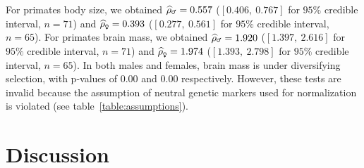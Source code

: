 \documentclass{article}
\newcommand{\NbrTaxa}{n}
\newcommand{\EstNI}{\widehat{\rho}}
\begin{document}
For primates body size, we obtained $\EstNI_{\text{\Male}} = 0.557$ ($[0.406,~0.767]$ for $95\%$ credible interval, $\NbrTaxa=71$) and $\EstNI_{\text{\Female}} = 0.393$ ($[0.277,~0.561]$ for $95\%$ credible interval, $\NbrTaxa=65$).
For primates brain mass, we obtained $\EstNI_{\text{\Male}} = 1.920$ ($[1.397,~2.616]$ for $95\%$ credible interval, $\NbrTaxa=71$) and $\EstNI_{\text{\Female}} = 1.974$ ($[1.393,~2.798]$ for $95\%$ credible interval, $\NbrTaxa=65$).
In both males and females, brain mass is under diversifying selection, with p-values of $0.00$ and $0.00$ respectively.
However, these tests are invalid because the assumption of neutral genetic markers used for normalization is violated (see table~\ref{table:assumptions}).

\section{Discussion}\label{sec:discussion}
\end{document}

